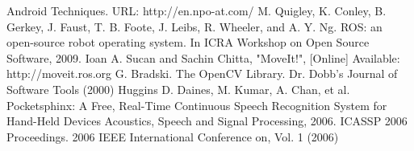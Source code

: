 \documentclass[letterpaper, 10 pt, conference]{ieeeconf}  %
\begin{document}
\addtolength{\textheight}{-12cm}   %









\begin{thebibliography}{99}

 Android Techniques. URL: http://en.npo-at.com/
 M. Quigley, K. Conley, B. Gerkey, J. Faust, T. B. Foote, J. Leibs, R. Wheeler, and A. Y. Ng. ROS: an open-source robot operating system. In ICRA Workshop on Open Source Software, 2009.
 Ioan A. Sucan and Sachin Chitta, "MoveIt!", [Online] Available: http://moveit.ros.org
 G. Bradski. The OpenCV Library. Dr. Dobb’s Journal of Software
Tools (2000) 
 Huggins D. Daines, M. Kumar, A. Chan, et al. Pocketsphinx: A Free,
Real-Time Continuous Speech Recognition System for Hand-Held Devices Acoustics, Speech and Signal Processing, 2006. ICASSP 2006 Proceedings. 2006 IEEE International Conference on, Vol. 1 (2006)


\end{thebibliography}
\end{document}
